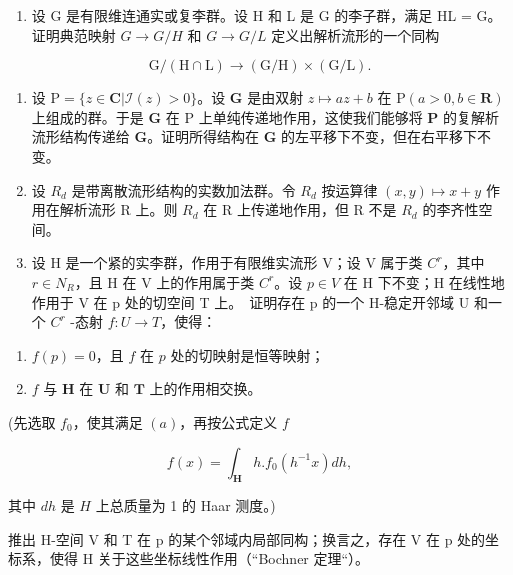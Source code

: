 
\begin{enumerate}
\def\labelenumi{\arabic{enumi}.}
\tightlist
\item
  设 G 是有限维连通实或复李群。设 H 和 L 是 G 的李子群，满足 HL = G。证明典范映射 \(G \rightarrow G/H\) 和 \(G \rightarrow G/L\) 定义出解析流形的一个同构
\end{enumerate}

\[
\mathrm{G} / (\mathrm{H} \cap \mathrm{L}) \rightarrow (\mathrm{G} / \mathrm{H}) \times (\mathrm{G} / \mathrm{L}).
\]

\begin{enumerate}
\def\labelenumi{\arabic{enumi}.}
\setcounter{enumi}{1}
\item
  设 \(\mathrm{P} = \{z\in \mathbf{C}|\mathcal{I}(z) > 0\}\)。设 \(\mathbf{G}\) 是由双射 \(z\mapsto az + b\) 在 \(\mathrm{P}(a > 0,b\in \mathbf{R})\) 上组成的群。于是 \(\mathbf{G}\) 在 \(\mathrm{P}\) 上单纯传递地作用，这使我们能够将 \(\mathbf{P}\) 的复解析流形结构传递给 \(\mathbf{G}\)。证明所得结构在 \(\mathbf{G}\) 的左平移下不变，但在右平移下不变。
\item
  设 \(R_{d}\) 是带离散流形结构的实数加法群。令 \(R_{d}\) 按运算律 \((x,y)\mapsto x+y\) 作用在解析流形 R 上。则 \(R_{d}\) 在 R 上传递地作用，但 R 不是 \(R_{d}\) 的李齐性空间。
\item
  设 H 是一个紧的实李群，作用于有限维实流形 V；设 V 属于类 \(C^{r}\)，其中 \(r \in N_{R}\)，且 H 在 V 上的作用属于类 \(C^{r}\)。设 \(p \in V\) 在 H 下不变；H 在线性地作用于 V 在 p 处的切空间 T 上。~证明存在 p 的一个 H-稳定开邻域 U 和一个 \(C^{r}\) -态射 \(f: U \to T\)，使得：
\end{enumerate}

\begin{enumerate}
\def\labelenumi{(\alph{enumi})}
\item
  \(f(p) = 0\)，且 \(f\) 在 \(p\) 处的切映射是恒等映射；
\item
  \(f\) 与 \(\mathbf{H}\) 在 \(\mathbf{U}\) 和 \(\mathbf{T}\) 上的作用相交换。
\end{enumerate}

(先选取 \(f_0\)，使其满足 \((a)\)，再按公式定义 \(f\)

\[
f (x) = \int_ {\mathbf {H}} h. f _ {0} (h ^ {- 1} x) d h,
\]

其中 \(dh\) 是 \(H\) 上总质量为 1 的 Haar 测度。)

推出 H-空间 V 和 T 在 p 的某个邻域内局部同构；换言之，存在 V 在 p 处的坐标系，使得 H 关于这些坐标线性作用（``Bochner 定理``）。

